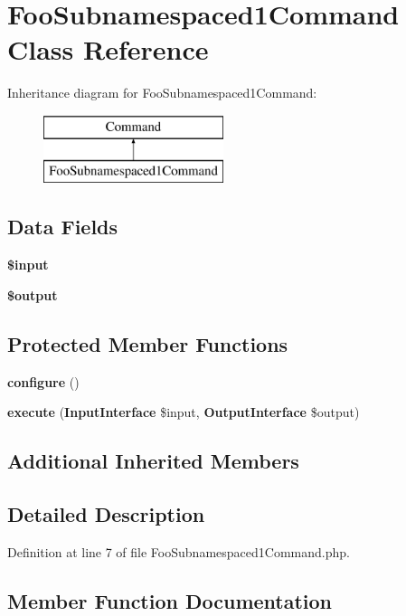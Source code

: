 \section{Foo\+Subnamespaced1\+Command Class Reference}
\label{class_foo_subnamespaced1_command}
Inheritance diagram for Foo\+Subnamespaced1\+Command\+:\begin{figure}[H]
\begin{center}
\leavevmode
\includegraphics[height=2.000000cm]{class_foo_subnamespaced1_command}
\end{center}
\end{figure}
\subsection*{Data Fields}
\begin{DoxyCompactItemize}
\item 
{\bf \$input}
\item 
{\bf \$output}
\end{DoxyCompactItemize}
\subsection*{Protected Member Functions}
\begin{DoxyCompactItemize}
\item 
{\bf configure} ()
\item 
{\bf execute} ({\bf Input\+Interface} \$input, {\bf Output\+Interface} \$output)
\end{DoxyCompactItemize}
\subsection*{Additional Inherited Members}


\subsection{Detailed Description}


Definition at line 7 of file Foo\+Subnamespaced1\+Command.\+php.



\subsection{Member Function Documentation}
